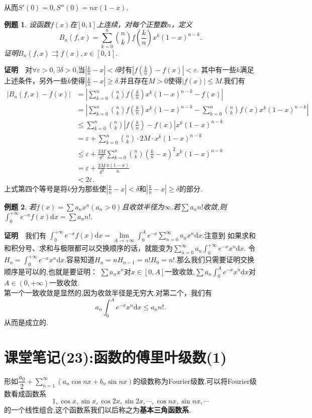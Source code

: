 \documentclass[UTF8]{article}
\newcommand{\dx}{\mathrm{d}x}
\newcommand{\zm}{\textbf{证明}$\quad$}
\newtheorem{exa}{\hspace{2em}例题}[section]
\begin{document}
  从而$S'(0)=0,S''(0)=nx(1-x).$
  \begin{exa}
    设函数$f(x)$在$[0,1]$上连续，对每个正整数$n$，定义
    $$B_n(f,x)=\sum_{k=0}^n\binom{n}{k}f(\frac{k}{n})x^k(1-x)^{n-k}.$$
    证明$B_n(f,x)\rightrightarrows f(x),x\in[0,1].$
  \end{exa}
  \zm 对$\forall\varepsilon>0,\exists \delta>0$,当$|\frac{k}{n}-x|<\delta$时有$|f(\frac{k}{n})-f(x)|<\varepsilon.$
  其中有一些$k$满足上述条件，另外一些$k$使得$|\frac{k}{n}-x|\ge\delta$.并且存在$M>0$使得$|f(x)|\le M.$我们有
  \begin{align*}
    \left|B_n(f,x)-f(x)\right|&=\left|\sum_{k=0}^n\binom{n}{k}f(\frac{k}{n})x^k(1-x)^{n-k}-f(x)\right|\\
    &=\left|\sum_{k=0}^n\binom{n}{k}f(\frac{k}{n})x^k(1-x)^{n-k}-\sum_{k=0}^n\binom{n}{k}f(x)x^k(1-x)^{n-k}\right|\\
    &\le\sum_{k=0}^n\binom{n}{k}\left|f(\frac{k}{n})-f(x)\right|x^k(1-x)^{n-k}\\
    &=\varepsilon+\sum_{k=0}^n\binom{n}{k}\cdot 2M\cdot x^k(1-x)^{n-k}\\
    &\le\varepsilon+\frac{2M}{\delta^2}\sum_{k=0}^n\binom{n}{k}(\frac{k}{n}-x)^2x^k(1-x)^{n-k}\\
    &=\varepsilon+\frac{2M}{\delta^2}\frac{x(1-x)}{n}\\
    &<2\varepsilon.
  \end{align*}
  上式第四个等号是将$k$分为那些使$|\frac{k}{n}-x|<\delta$和$|\frac{k}{n}-x|\ge\delta$的部分.
  \begin{exa}
    若$f(x)=\sum a_nx^n(a_n>0)$且收敛半径为$\infty$.若$\sum a_n n!$收敛,则$\int_0^{+\infty}e^{-x}f(x)\dx=\sum a_nn!.$
  \end{exa}
  \zm 我们有
  $\int_0^{+\infty}e^{-x}f(x)\dx=\lim\limits_{A\to+\infty}\int_0^Ae^{-x}\sum\limits_{n=0}^\infty a_nx^n\dx.$注意到
  如果求和和积分号、求和与极限都可以交换顺序的话，就能变为$\sum\limits_{n=0}^\infty a_n\int_0^{+\infty}e^{-x}x^n\dx$.
  令$H_n=\int_0^{+\infty}e^{-x}x^n\dx.$容易知道$H_n=nH_{n-1}=n!H_0=n!.$那么我们只需要证明交换顺序是可以的,也就是要证明：
  $\sum a_nx^n$对$x\in[0,A]$一致收敛,$\sum a_n\int_0^Ae^{-x}x^n\dx$对$A\in(0,+\infty)$一致收敛.\\
  第一个一致收敛是显然的,因为收敛半径是无穷大.对第二个，我们有
  $$a_n\int_0^Ae^{-x}x^n\dx\le a_nn!.$$
  从而是成立的.

  \clearpage
  \section{课堂笔记(23):函数的傅里叶级数(1)}
  形如$\dfrac{a_0}{2}+\sum\limits_{n=1}^\infty(a_n\cos nx+b_n\sin nx)$的级数称为Fourier级数.可以将Fourier级数看成函数系
  $$1,\cos x,\sin x,\cos 2x,\sin 2x,\cdots,\cos nx,\sin nx,\cdots$$
  的一个线性组合,这个函数系我们以后称之为\textbf{基本三角函数系}.
\end{document}
